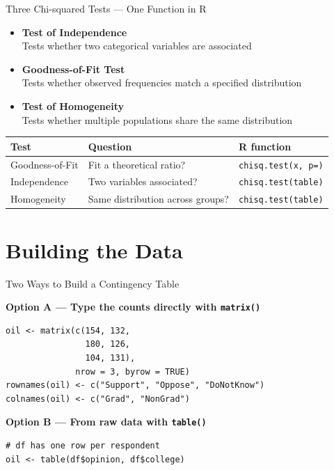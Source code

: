 \documentclass{beamer}					%
\begin{document}
\begin{frame}{Three Chi-squared Tests --- One Function in R}
\begin{itemize}
    \item \textbf{Test of Independence}\\
    \hspace{1em} Tests whether {two categorical variables are associated}
    
    \vspace{0.6em}
    \item \textbf{Goodness-of-Fit Test} \\
    \hspace{1em} Tests whether {observed frequencies match a specified distribution}
    
    \vspace{0.6em}
    \item \textbf{Test of Homogeneity} \\
    \hspace{1em} Tests whether {multiple populations share the same distribution}
\end{itemize}
\small
\begin{center}
\begin{tabular}{lll}
\toprule
\textbf{Test} & \textbf{Question} & \textbf{R function} \\
\midrule
Goodness-of-Fit & Fit a theoretical ratio? & \texttt{chisq.test(x, p=)} \\
Independence & Two variables associated? & \texttt{chisq.test(table)} \\
Homogeneity & Same distribution across groups? & \texttt{chisq.test(table)} \\
\bottomrule
\end{tabular}
\end{center}


\end{frame}

\section{Building the Data}

\begin{frame}[fragile]{Two Ways to Build a Contingency Table}

\textbf{Option A --- Type the counts directly with \texttt{matrix()}}
\begin{lstlisting}
oil <- matrix(c(154, 132,
                180, 126,
                104, 131),
              nrow = 3, byrow = TRUE)
rownames(oil) <- c("Support", "Oppose", "DoNotKnow")
colnames(oil) <- c("Grad", "NonGrad")
\end{lstlisting}

\vspace{0.4em}
\textbf{Option B --- From raw data with \texttt{table()}}
\begin{lstlisting}
# df has one row per respondent
oil <- table(df$opinion, df$college)
\end{lstlisting}
\end{frame}
\end{document}
